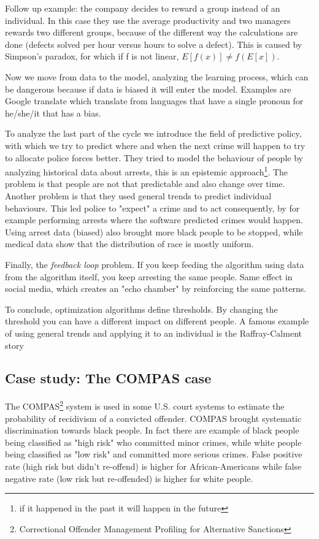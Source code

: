 Follow up example: the company decides to reward a group instead of an individual. In this case they use the average productivity and two managers rewards two different groups, because of the different way the calculations are done (defects solved per hour versus hours to solve a defect). This is caused by Simpson's paradox, for which if f is not linear, $E[f(x)] \neq f(E[x])$.

Now we move from data to the model, analyzing the learning process, which can be dangerous because if data is biased it will enter the model. Examples are Google translate which translate from languages that have a single pronoun for he/she/it that has a bias.

To analyze the last part of the cycle we introduce the field of predictive policy, with which we try to predict where and when the next crime will happen to try to allocate police forces better. They tried to model the behaviour of people by analyzing historical data about arrests, this is an epistemic approach\footnote{if it happened in the past it will happen in the future}. The problem is that people are not that predictable and also change over time. Another problem is that they used general trends to predict individual behaviours. This led police to "expect" a crime and to act consequently, by for example performing arrests where the software predicted crimes would happen. Using arrest data (biased) also brought more black people to be stopped, while medical data show that the distribution of race is mostly uniform. 

Finally, the \textit{feedback loop} problem. If you keep feeding the algorithm using data from the algorithm itself, you keep arresting the same people. Same effect in social media, which creates an "echo chamber" by reinforcing the same patterns.

To conclude, optimization algorithms define thresholds. By changing the threshold you can have a different impact on different people. A famous example of using general trends and applying it to an individual is the Raffray-Calment story

\subsection{Case study: The COMPAS case}
The COMPAS\footnote{Correctional Offender Management Profiling for Alternative Sanctions} system is used in some U.S. court systems to estimate the probability of recidivism of a convicted offender.
COMPAS brought systematic discrimination towards black people. In fact there are example of black people being classified as "high risk" who committed minor crimes, while white people being classified  as "low risk" and committed more serious crimes. False positive rate (high risk but didn't re-offend) is higher for African-Americans while false negative rate (low risk but re-offended) is higher for white people.

